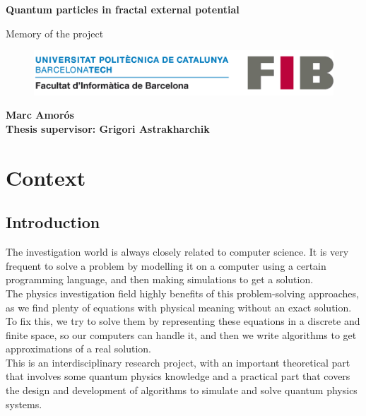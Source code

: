 \documentclass{article}
\begin{document}
\begin{titlepage}
    \begin{center}
        \vspace*{1cm}
        \Huge
        \textbf{Quantum particles in fractal external potential}

        \vspace{0.5cm}
        \Large
        Memory of the project
        \vfill
        \begin{figure}[h!]
            \includegraphics[width=\textwidth]{./logo-fib.png}
        \end{figure}
        \textbf{Marc Amorós}\\
        \vspace{0.5cm}
        \textbf{Thesis supervisor: Grigori Astrakharchik}\\
        \vspace{0.5cm}

   \end{center}
\end{titlepage}

\tableofcontents
\break

\section{Context}

\subsection{Introduction}
The investigation world is always closely related to computer science. It is very frequent 
to solve a problem by modelling it on a computer using a certain programming language, and 
then making simulations to get a solution.\\

The physics investigation field highly benefits of this problem-solving approaches, as we 
find plenty of equations with physical meaning without an exact solution. To fix this, we 
try to solve them by representing these equations in a discrete and finite space, so our computers 
can handle it, and then we write algorithms to get approximations of a real solution.\\

This is an interdisciplinary research project, with an important theoretical part that involves 
some quantum physics knowledge and a practical part that covers the design and development of 
algorithms to simulate and solve quantum physics systems.\\
\end{document}
